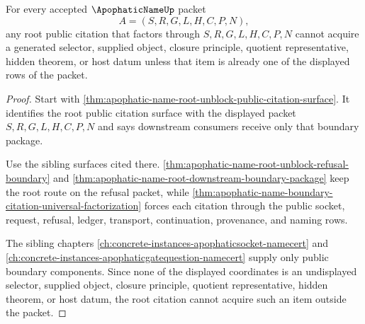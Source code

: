 \begin{theorem}
\label{thm:apophatic-name-root-public-citation-selector-exclusion}
For every accepted $\ApophaticNameUp$ packet
$$
A=(S,R,G,L,H,C,P,N),
$$
any root public citation that factors through $S,R,G,L,H,C,P,N$ cannot acquire a generated selector, supplied object, closure principle, quotient representative, hidden theorem, or host datum unless that item is already one of the displayed rows of the packet.
\end{theorem}
\begin{proof}
Start with \autoref{thm:apophatic-name-root-unblock-public-citation-surface}. It identifies the root public citation surface with the displayed packet $S,R,G,L,H,C,P,N$ and says downstream consumers receive only that boundary package.

Use the sibling surfaces cited there. \autoref{thm:apophatic-name-root-unblock-refusal-boundary} and \autoref{thm:apophatic-name-root-downstream-boundary-package} keep the root route on the refusal packet, while \autoref{thm:apophatic-name-boundary-citation-universal-factorization} forces each citation through the public socket, request, refusal, ledger, transport, continuation, provenance, and naming rows.

The sibling chapters \autoref{ch:concrete-instances-apophaticsocket-namecert} and \autoref{ch:concrete-instances-apophaticgatequestion-namecert} supply only public boundary components. Since none of the displayed coordinates is an undisplayed selector, supplied object, closure principle, quotient representative, hidden theorem, or host datum, the root citation cannot acquire such an item outside the packet.
\end{proof}

